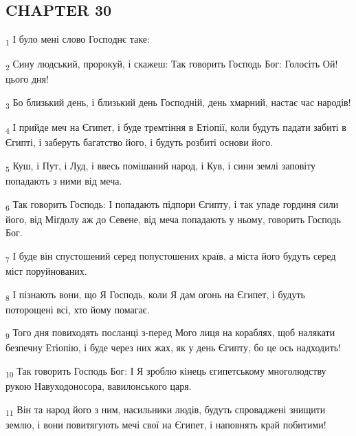 \subsection{CHAPTER 30}
\begin{tcolorbox}
\textsubscript{1} І було мені слово Господнє таке:
\end{tcolorbox}
\begin{tcolorbox}
\textsubscript{2} Сину людський, пророкуй, і скажеш: Так говорить Господь Бог: Голосіть Ой! цього дня!
\end{tcolorbox}
\begin{tcolorbox}
\textsubscript{3} Бо близький день, і близький день Господній, день хмарний, настає час народів!
\end{tcolorbox}
\begin{tcolorbox}
\textsubscript{4} І прийде меч на Єгипет, і буде тремтіння в Етіопії, коли будуть падати забиті в Єгипті, і заберуть багатство його, і будуть розбиті основи його.
\end{tcolorbox}
\begin{tcolorbox}
\textsubscript{5} Куш, і Пут, і Луд, і ввесь помішаний народ, і Кув, і сини землі заповіту попадають з ними від меча.
\end{tcolorbox}
\begin{tcolorbox}
\textsubscript{6} Так говорить Господь: І попадають підпори Єгипту, і так упаде гординя сили його, від Міґдолу аж до Севене, від меча попадають у ньому, говорить Господь Бог.
\end{tcolorbox}
\begin{tcolorbox}
\textsubscript{7} І буде він спустошений серед попустошених країв, а міста його будуть серед міст поруйнованих.
\end{tcolorbox}
\begin{tcolorbox}
\textsubscript{8} І пізнають вони, що Я Господь, коли Я дам огонь на Єгипет, і будуть поторощені всі, хто йому помагає.
\end{tcolorbox}
\begin{tcolorbox}
\textsubscript{9} Того дня повиходять посланці з-перед Мого лиця на кораблях, щоб налякати безпечну Етіопію, і буде через них жах, як у день Єгипту, бо це ось надходить!
\end{tcolorbox}
\begin{tcolorbox}
\textsubscript{10} Так говорить Господь Бог: І Я зроблю кінець єгипетському многолюдству рукою Навуходоносора, вавилонського царя.
\end{tcolorbox}
\begin{tcolorbox}
\textsubscript{11} Він та народ його з ним, насильники людів, будуть спроваджені знищити землю, і вони повитягують мечі свої на Єгипет, і наповнять край побитими!
\end{tcolorbox}
